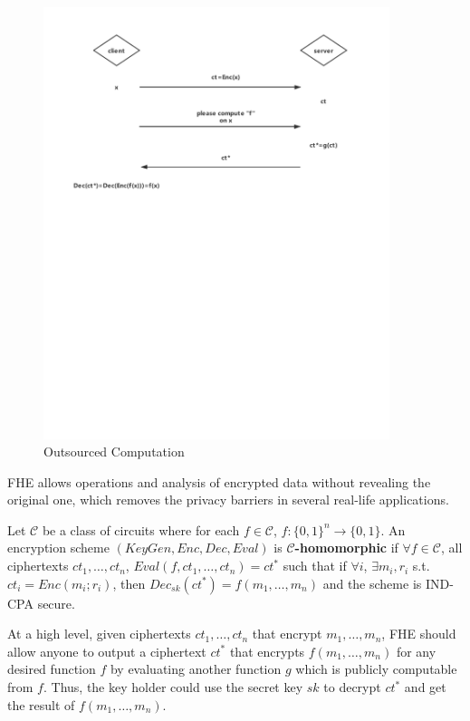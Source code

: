\documentclass[usletter]{article}
\begin{document}
\begin{figure}[!htbp]
\begin{center}
\includegraphics[width=0.9\textwidth]{client-server.pdf}
\end{center}
\caption{Outsourced Computation}
\label{com}
\end{figure}

 FHE allows operations and analysis of encrypted data without revealing the original one, which removes the privacy barriers in several real-life applications. 

\begin{definition} Let $\mathcal{C}$ be a class of circuits where for each $f\in\mathcal{C}$, $f:\{0,1\}^n \rightarrow \{0,1\}$. An encryption scheme $(KeyGen, Enc, Dec, Eval)$ is \textbf{$\mathcal{C}$-homomorphic} if $\forall f\in \mathcal{C}$, all ciphertexts $ct_1, \dots, ct_n$, $Eval(f, ct_1,\dots,ct_n)=ct^*$ such that if  $\forall i$, $\exists m_i, r_i$ s.t. $ct_i=Enc(m_i;r_i)$, then $Dec_{sk}(ct^*)=f(m_1,\dots,m_n)$ and the scheme is IND-CPA secure.
\end{definition}
At a high level, given ciphertexts $ct_1,\dots,ct_n$ that encrypt $m_1,\dots,m_n$, FHE should allow anyone to output a ciphertext  $ct^*$ that encrypts $f(m_1,\dots,m_n)$ for any desired function $f$ by evaluating another function $g$ which is publicly computable from $f$. Thus, the key holder could use the secret key $sk$ to decrypt $ct^*$ and get the result of $f(m_1,\dots,m_n)$. 
\end{document}
